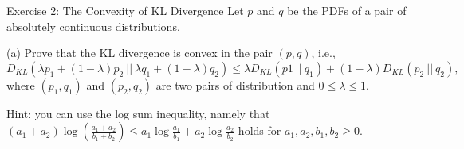 \documentclass[aspectratio=169]{beamer}
\newcommand{\kld}[1]{D_{KL}\left(#1\right)}
\begin{document}
\begin{frame}{Exercise 2: The Convexity of KL Divergence}
	Let $p$ and $q$ be the PDFs of a pair of absolutely continuous distributions. 
	
	(a) Prove that the KL divergence is convex in the pair $(p, q)$, i.e., 
	$$\kld{\lambda p_1 + (1 - \lambda) p_2 \ || \ \lambda q_1 + (1-\lambda) q_2} \leq \lambda \kld{p1 \ || \ q_1} + (1 - \lambda) \kld{p_2 \ || \ q_2},$$
	where $(p_1, q_1)$ and $(p_2, q_2)$ are two pairs of distribution and $0 \leq \lambda \leq 1$.
	
	\vspace{20pt}
	Hint: you can use the log sum inequality, namely that $(a_1 + a_2) \log \left( \frac{a_1 + a_2}{b_1 + b_2} \right) \leq a_1 \log \frac{a_1}{b_1} + a_2 \log \frac{a_2}{b_2}$ holds for $a_1, a_2, b_1, b_2 \geq 0$.
\end{frame}
\end{document}
